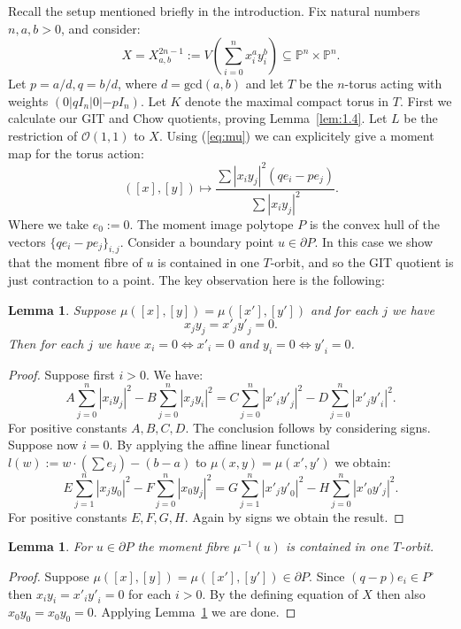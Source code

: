 \documentclass{amsart}
\newtheorem{lemma}[theorem]{Lemma}
\theoremstyle{definition}
\newcommand{\PP}{\mathbb{P}}
\begin{document}
Recall the setup mentioned briefly in the introduction. Fix natural numbers \(n,a,b>0\), and consider:
\[
X = X_{a,b}^{2n-1} := V \left( \sum_{i=0}^n x_i^a y_i^b \right) \subseteq \PP^n \times \PP^n.
\]
Let \(p = a/d, q = b/d\), where \(d = \text{gcd}(a,b)\) and let \(T\) be the \(n\)-torus acting with weights \((0|q I_n|0|-p I_n)\). Let \(K\) denote the maximal compact torus in \(T\).
First we calculate our GIT and Chow quotients, proving Lemma~\ref{lem:1.4}. Let \(L\) be the restriction of \(  \mathcal{O}(1,1)\) to \(X\). Using (\ref{eq:mu}) we can explicitely give a moment map for the torus action:
\[
([x],[y]) \mapsto \frac{ \sum |x_iy_j|^2( q e_i - p e_j)}{\sum |x_iy_j|^2}.
\]
Where we take \(e_0 := 0\). The moment image polytope \(P\) is the convex hull of the vectors \(\{ q e_i - p e_j \}_{i,j}\). Consider a boundary point \(u \in \partial P\). In this case we show that the moment fibre of \(u\) is contained in one \(T\)-orbit, and so the GIT quotient is just contraction to a point. The key observation here is the following:
%
%
%
\begin{lemma}\label{lem:X}
Suppose \(\mu([x],[y]) = \mu([x'],[y'])\) and for each \(j\) we have
\[
x_jy_j = {x'}_j{y'}_j = 0.
\]
Then for each \(j\) we have \(x_i=0 \iff {x'}_i = 0\) and \(y_i = 0 \iff {y'}_i = 0 \).
\end{lemma}
%
%
%
\begin{proof}
Suppose first \(i>0\). We have:
\[
A \sum_{j=0}^n |x_iy_j|^2 - B\sum_{j=0}^n  |x_jy_i|^2  = C \sum_{j=0}^n  |{x'}_i{y'}_j|^2 - D \sum_{j=0}^n  |{x'}_j{y'}_i|^2.
\] 
For positive constants \(A,B,C,D\). The conclusion follows by considering signs. Suppose now \(i =0\). By applying the affine linear functional \(l(w) := w \cdot \left( \sum e_j \right) - (b-a)\) to  \(\mu(x,y) = \mu(x',y')\) we obtain:
\[
 E \sum_{j=1}^n  |x_jy_0|^2  - F \sum_{j=0}^n |x_0y_j|^2 =  G \sum_{j=1}^n  |{x'}_j{y'}_0|^2 - H \sum_{j=0}^n  |{x'_0}{y'_j}|^2.
\]
For positive constants \(E,F,G,H\). Again by signs we obtain the result.
\end{proof}
%
%
%
\begin{lemma} \label{lem:3.2}
For \(u \in \partial P\) the moment fibre \(\mu^{-1}(u)\) is contained in one \(T\)-orbit.
\end{lemma}
%
%
%
\begin{proof}
Suppose \(\mu([x],[y]) = \mu([{x'}],[{y'}]) \in \partial P\). Since \( (q-p)e_i \in P^\circ\) then \(x_iy_i = {x'}_i{y'}_i = 0\) for each \(i>0\). By the defining equation of \(X\) then also \(x_0y_0 = x_0y_0 = 0\). Applying Lemma~\ref{lem:X} we are done.
\end{proof}
\end{document}
